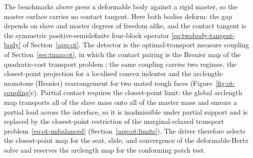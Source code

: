 \documentclass{svjour3}                 %
\begin{document}
The benchmarks above press a deformable body against a rigid master, so the master surface carries no
contact tangent. Here both bodies deform: the gap depends on
slave and master degrees of freedom alike, and the contact tangent is the symmetric positive-semidefinite
four-block operator \eqref{eq:twobody-tangent-body} of Section~\ref{app:ot}. The detector is the optimal-transport
measure coupling of Section~\ref{sec:tmap:ot}, in which the contact pairing is the Brenier map of the
quadratic-cost transport problem
\citep{brenier1991polar,mccann1995existence,santambrogio2015optimal}; the same coupling carries two regimes, the
closest-point projection for a localised convex indenter and the arclength-monotone (Brenier) rearrangement for
two mated rough faces (Figure~\ref{fig:ot-coupling}c). Partial contact requires the closest-point limit:
the global arclength map transports all of the slave mass onto all of the master mass and smears a partial load
across the interface, so it is inadmissible under partial support and is replaced by the closest-point
restriction of the marginal-relaxed transport problem~\eqref{eq:ot-unbalanced} (Section~\ref{app:ot:limits}).
The driver therefore selects the closest-point map for the seat, slide, and convergence of the
deformable-Hertz solve and reserves the arclength map for the conforming patch test.
\end{document}
